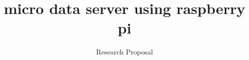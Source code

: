 \documentclass{sig-alternate-br}
\begin{document}
%

\title{micro data server using raspberry pi}
 \subtitle{Research Proposal}

%
%
%
%
%
\end{document}
